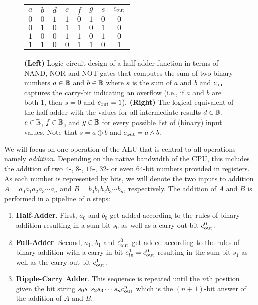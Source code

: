 \begin{figure}
\begin{minipage}[c]{.65\linewidth}
    \end{minipage}
    \hfill
    \begin{minipage}[c]{.34\linewidth}
        \centering
        \begin{tabular}{c|c||c|c|c|c|c|c}
            $a$ & $b$ & $d$ & $e$ & $f$ & $g$ & $s$ & $c_{\mathrm{out}}$ \\
            \hline
            $0$ & $0$ & $1$ & $1$ & $0$ & $1$ & $0$ & $0$     \\
            $0$ & $1$ & $0$ & $1$ & $1$ & $0$ & $1$ & $0$     \\
            $1$ & $0$ & $0$ & $1$ & $1$ & $0$ & $1$ & $0$     \\
            $1$ & $1$ & $0$ & $0$ & $1$ & $1$ & $0$ & $1$     \\
        \end{tabular}
    \end{minipage}
    \caption{{\bf (Left)} Logic circuit design of a half-adder function in terms of NAND, NOR and NOT gates that computes the sum of two binary numbers $a \in \mathbb{B}$ and $b \in \mathbb{B}$ where $s$ is the sum of $a$ and $b$ and $c_{\mathrm{out}}$ captures the carry-bit indicating an overflow (i.e., if $a$ and $b$ are both $1$, then $s=0$ and $c_{\mathrm{out}}=1$). {\bf (Right)} The logical equivalent of the half-adder with the values for all intermediate results $d \in \mathbb{B}$, $e \in \mathbb{B}$, $f \in \mathbb{B}$, and $g \in \mathbb{B}$ for every possible list of (binary) input values. Note that $s = a \oplus b$ and $c_{\mathrm{out}} = a \land b$. \label{fig:half-adder}}
\end{figure}

We will focus on one operation of the ALU that is central to all operations namely {\em addition}. Depending on the native bandwidth of the CPU, this includes the addition of two $4$-, $8$-, $16$-, $32$- or even $64$-bit numbers provided in registers. As each number is represented by bits, we will denote the two inputs to addition $A=a_0a_1a_2a_3\cdots a_n$ and $B=b_0b_1b_2b_3\cdots b_n$, respectively. The addition of $A$ and $B$ is performed in a pipeline of $n$ steps:
\begin{enumerate}
    \item {\bf Half-Adder}. First, $a_0$ and $b_0$ get added according to the rules of binary addition resulting in a sum bit $s_0$ as well as a carry-out bit $c_{\mathrm{out}}^0$.
    \item {\bf Full-Adder}. Second, $a_1$, $b_1$ and $c_{\mathrm{out}}^0$ get added according to the rules of binary addition with a carry-in bit $c_{\mathrm{in}}^1=c_{\mathrm{out}}^0$ resulting in the sum bit $s_1$ as well as the carry-out bit $c_{\mathrm{out}}^1$.
    \item {\bf Ripple-Carry Adder}. This sequence is repeated until the $n$th position given the bit string $s_0s_1s_2s_3\cdots s_nc_{\mathrm{out}}^n$ which is the $(n+1)$-bit answer of the addition of $A$ and $B$.
\end{enumerate}


